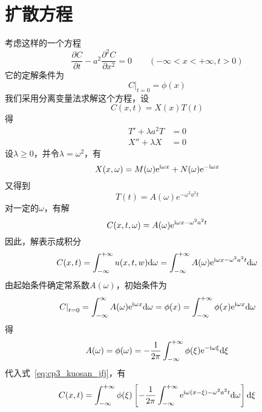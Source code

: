 \section{扩散方程}
考虑这样的一个方程
\begin{equation}
 \dfrac{\partial C}{\partial t}-a^2\dfrac{\partial^2 C}{\partial x^2}=0\qquad(-\infty < x < +\infty,t>0)
\end{equation}
它的定解条件为
\begin{equation}
 \left.C\right|_{t=0}=\phi(x)
\end{equation}
我们采用分离变量法求解这个方程，设
\begin{equation}
 C(x,t)=X(x)T(t)
\end{equation}
得
\begin{align}
T'+\lambda a^2 T & =0\\
X'' + \lambda X &=0
\end{align}
设$\lambda\geq0$，并令$\lambda=\omega^2$，有
\begin{equation}
 X(x,\omega)=M(\omega)\mathrm{e}^{\mathrm{i}\omega x}+N(\omega)\mathrm{e}^{-\mathrm{i}\omega x}
\end{equation}
又得到
\begin{equation}
 T(t)=A(\omega)e^{-\omega^2 a^2 t}
\end{equation}
对一定的$\omega$，有解
\begin{equation}
 C(x,t,\omega)=A(\omega)\mathrm{e}^{\mathrm{i}\omega x-\omega^2 a^2 t}
\end{equation}
因此，解表示成积分
\begin{equation}\label{eq:cp3_kuosan_jfj}
 C(x,t)=\int_{-\infty}^{+\infty}u(x,t,w)\mathrm{d}\omega 
 = \int_{-\infty}^{+\infty}A(\omega)\mathrm{e}^{\mathrm{i}\omega x-\omega^2 a^2 t}\mathrm{d}\omega
\end{equation}
由起始条件确定常系数$A(\omega)$，初始条件为
\begin{equation}
 \left.C\right|_{t=0} = \int_{-\infty}^{\infty} A(\omega)\mathrm{e}^{\mathrm{i}\omega x}\mathrm{d}\omega
 =\phi(x)=\int_{-\infty}^{+\infty}\phi(x)\mathrm{e}^{\mathrm{i}\omega x}\mathrm{d}\omega
\end{equation}
得
\begin{equation}
 A(\omega)=\phi(\omega)=-\dfrac{1}{2\pi}\int_{-\infty}^{+\infty}\phi(\xi)
 \mathrm{e}^{-\mathrm{i}\omega\xi}\mathrm{d}\xi
\end{equation}
代入式~\eqref{eq:cp3_kuosan_jfj}，有
\begin{equation}\label{eq:cp3_kuosan_jiex}
 C(x,t)=\int_{-\infty}^{+\infty}\phi(\xi)
 \left[-\dfrac{1}{2\pi}\int_{-\infty}^{+\infty}\mathrm{e}^{\mathrm{i}\omega(x-\xi)-\omega^2a^2t}\mathrm{d}\omega\right]\mathrm{d}\xi
\end{equation}\par
